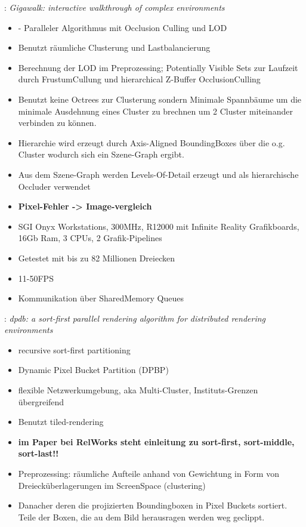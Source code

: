 \cite{baxter}: \textit{Gigawalk: interactive walkthrough of complex environments}
\begin{itemize}
 \item - Paralleler Algorithmus mit Occlusion Culling und LOD
 \item Benutzt räumliche Clusterung und Lastbalancierung
 \item Berechnung der LOD im Preprozessing; Potentially Visible Sets zur Laufzeit durch FrustumCullung und hierarchical Z-Buffer OcclusionCulling
 \item Benutzt keine Octrees zur Clusterung sondern Minimale Spannbäume um die minimale Ausdehnung eines Cluster zu brechnen um 2 Cluster miteinander verbinden zu können.
 \item Hierarchie wird erzeugt durch Axis-Aligned BoundingBoxes über die o.g. Cluster wodurch sich ein Szene-Graph ergibt.
 \item Aus dem Szene-Graph werden Levels-Of-Detail erzeugt und als hierarchische Occluder verwendet
 \item \textbf{Pixel-Fehler -> Image-vergleich}
 \item SGI Onyx Workstations, 300MHz, R12000 mit Infinite Reality Grafikboards, 16Gb Ram, 3 CPUs, 2 Grafik-Pipelines
 \item Getestet mit bis zu 82 Millionen Dreiecken
 \item 11-50FPS
 \item Kommunikation über SharedMemory Queues
\end{itemize}

\cite{dpbp}: \textit{dpdb: a sort-first parallel rendering algorithm for distributed rendering environments}
\begin{itemize}
 \item recursive sort-first partitioning
 \item Dynamic Pixel Bucket Partition (DPBP)
 \item flexible Netzwerkumgebung, aka Multi-Cluster, Instituts-Grenzen übergreifend
 \item Benutzt tiled-rendering
 \item \textbf{im Paper bei RelWorks steht einleitung zu sort-first, sort-middle, sort-last!!}
 \item Preprozessing: räumliche Aufteile anhand von Gewichtung in Form von Dreiecküberlagerungen im ScreenSpace (clustering)
 \item Danacher deren die projizierten Boundingboxen in Pixel Buckets sortiert. Teile der Boxen, die au dem Bild herausragen werden weg geclippt.
\end{itemize}

